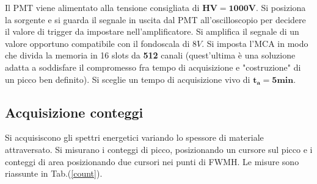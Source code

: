 \documentclass[12pt,a4paper,openright,twoside]{article}
\numberwithin{equation}{section} %
\begin{document}
Il PMT viene alimentato alla tensione consigliata di $\mathbf{HV=1000V}$.
Si posiziona la sorgente e si guarda il segnale in uscita dal PMT all'oscilloscopio per decidere il valore di trigger da impostare nell'amplificatore.
Si amplifica il segnale di un valore opportuno compatibile con il fondoscala di $8V$.
Si imposta l'MCA in modo che divida la memoria in 16 slots da \textbf{512 }canali (quest'ultima è una soluzione adatta a soddisfare il compromesso fra tempo di acquisizione e "costruzione" di un picco ben definito). Si sceglie un tempo di acquisizione vivo di {$\mathbf{t_a=5min}$}.

\pagebreak
\subsection{Acquisizione conteggi}

Si acquisiscono gli spettri energetici variando lo spessore di materiale attraversato. Si misurano i conteggi di picco, posizionando un cursore sul picco e i conteggi di area posizionando due cursori nei punti di FWMH.
Le misure sono riassunte in Tab.(\ref{count}).
\end{document}
